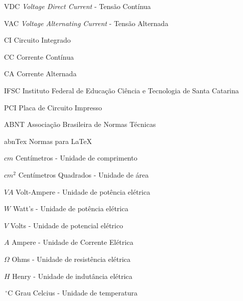 \documentclass[
	12pt,				%
	openright,			%
	twoside,			%
	a4paper,			%
	chapter=TITLE,		%
	english,			%
	french,             %
	spanish,			%
	brazil,				%
	]{abntex2}
\begin{document}
\listoffigures*
\cleardoublepage

\listoftables*
\cleardoublepage

\begin{siglas}
   \item[VDC] \textit{Voltage Direct Current} - Tensão Contínua
   \item[VAC] \textit{Voltage Alternating Current} - Tensão Alternada
   \item[CI] Circuito Integrado
   \item[CC] Corrente Contínua
   \item[CA] Corrente Alternada
   \item[IFSC] Instituto Federal de Educação Ciência e Tecnologia de Santa Catarina
   \item[PCI] Placa de Circuito Impresso
   \item[ABNT] Associação Brasileira de Normas Técnicas
   \item[abnTex] Normas para \LaTeX
   \end{siglas}

\begin{simbolos}
   \item[$cm$] Centímetros - Unidade de comprimento
   \item[$cm^{2}$] Centímetros Quadrados - Unidade de área
   \item[$VA$] Volt-Ampere - Unidade de potência elétrica
   \item[$W$] Watt's - Unidade de potência elétrica
   \item[$V$] Volts - Unidade de potencial elétrico
 	\item[$A$] Ampere - Unidade de Corrente Elétrica
 	\item[$\Omega$] Ohms - Unidade de resistência elétrica
 	\item[$H$] Henry - Unidade de indutância elétrica
 	\item[$\,^{\circ}\mathrm{C}$] Grau Celcius - Unidade de temperatura
\end{simbolos}
\end{document}
